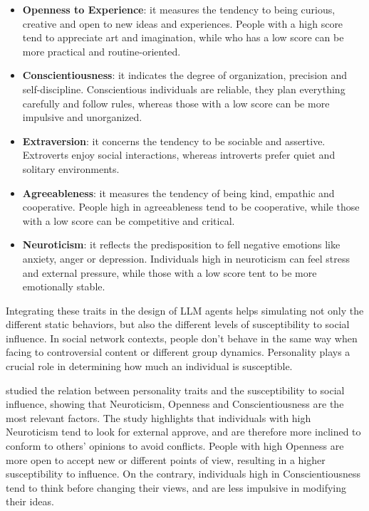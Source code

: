 \begin{itemize}
    \item \textbf{Openness to Experience}: it measures the tendency to being curious, creative and open to new ideas and experiences. People with a high score tend to appreciate art and imagination, while who has a low score can be more practical and routine-oriented.
    
    \item \textbf{Conscientiousness}: it indicates the degree of organization, precision and self-discipline. Conscientious individuals are reliable, they plan everything carefully and follow rules, whereas those with a low score can be more impulsive and unorganized.
    
    \item \textbf{Extraversion}: it concerns the tendency to be sociable and assertive. Extroverts enjoy social interactions, whereas introverts prefer quiet and solitary environments. 
    
    \item \textbf{Agreeableness}: it measures the tendency of being kind, empathic and cooperative. People high in agreeableness tend to be cooperative, while those with a low score can be competitive and critical.
    
    \item \textbf{Neuroticism}: it reflects the predisposition to fell negative emotions like anxiety, anger or depression. Individuals high in neuroticism can feel stress and external pressure, while those with a low score tent to be more emotionally stable. 
\end{itemize}


\medskip
Integrating these traits in the design of LLM agents helps simulating not only the different static behaviors, but also the different levels of susceptibility to social influence.
In social network contexts, people don't behave in the same way when facing to controversial content or different group dynamics.
Personality plays a crucial role in determining how much an individual is susceptible.

\medskip
\citet{oyibo2019personality} studied the relation between personality traits and the susceptibility to social influence, showing that Neuroticism, Openness and Conscientiousness are the most relevant factors.
The study highlights that individuals with high Neuroticism tend to look for external approve, and are therefore more inclined to conform to others' opinions to avoid conflicts.
People with high Openness are more open to accept new or different points of view, resulting in a higher susceptibility to influence.
On the contrary, individuals high in Conscientiousness tend to think before changing their views, and are less impulsive in modifying their ideas.

